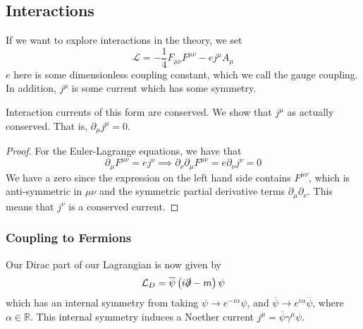 \subsection{Interactions} 
If we want to explore interactions in the theory, 
we set 
\[
 \mathcal{ L }  = - \frac{1}{4 } F _{ \mu \nu } F ^{ \mu \nu }  - e j ^ \mu A _ \mu 
\] $ e $ here is some dimensionless coupling constant, 
which we call the gauge coupling. In addition, $ j ^ \mu $ 
is some current which has some symmetry. 

\begin{claim}{Interaction currents of this form are conserved.}
	We show that $ j ^ \mu $ as actually conserved. 
	That is, $ \partial  _ \mu j ^ \mu  = 0 $. 
	\begin{proof}
	For the Euler-Lagrange equations, we have that 
\[
 \partial  _ \mu F ^{ \mu \nu }  = e j ^ \nu \implies \partial  _ \nu \partial  _ \mu F ^{ \mu \nu } 
  = e \partial  _ \nu j ^ \nu  = 0 
\] We have a zero since the expression 
on the left hand side contains $ F^{ \mu \nu } $, 
which is anti-symmetric in $ \mu \nu $ and the 
symmetric partial derivative terms $ \partial  _ \mu \partial  _ \nu $. 
This means that $ j ^ \nu $ is a conserved current. 	
	\end{proof}
\end{claim}
\subsubsection{Coupling to Fermions} 
Our Dirac part of our Lagrangian 
is now given by 
\[
	\mathcal{ L } _ D = \overline{ \psi } \left( i \slashed{\partial} -m  \right) \psi 
\] which has an internal symmetry from taking $ \psi \to e ^{ - i \alpha } \psi $, 
and $ \overline{\psi } \to e ^{ i \alpha } \overline{ \psi } $, 
where $ \alpha \in \mathbb{  R} $. This internal symmetry 
induces a Noether current $ j ^ \mu  = \overline{\psi } \gamma ^ \mu \psi $.

